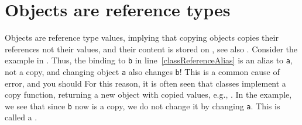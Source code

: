 \begin{comment}
Combinations of non-static member definitions are shown in \Cref{classMemberDefinition}.
%
\fsCode{classMemberDefinition}{classMemberDefinition}{A large variation of class member definitions. This program intentionally does not compile, but demonstrates variation that will, and problematic lines are indicated by the in-code comments.}{}
%
The \lstinline{val}-keyword in this context has not been discussed previously.\jon{maybe mention ``Explicit Field'', \url{https://docs.microsoft.com/en-us/dotnet/fsharp/language-reference/members/explicit-fields-the-val-keyword}.} \lstinline{staticMemberV} and \lstinline{staticMemberValV} have the same interface. The \lstinline{[<DefaultValue>] val mutable valMutableV : int} has not been discussed and is discouraged, but gives a mutable property that is initialized to the type's default value, e.g., \lstinline{Unchecked.defaultof<int>} in this case. \idx{\lstinline{[<DefaultValue>]}} is called an \idx{attribute}, but will not be discussed further.\jon{Should attributes be included \url{https://docs.microsoft.com/en-us/dotnet/fsharp/language-reference/attributes}?} Defining mutable properties is illegal, but allowed using explicit get and set functions. The definitions for \lstinline{valMutableV}, \lstinline{memberValGetSetV} and \lstinline{memberThisGetSetV} gives the same interface to a mutable variable, but with slight variation in how their initial value is set, and how get and set actions can be programmed. In general, \advice{minimize the use of constructions using the \keyword{val}-keyword in class definitions for brevity.}  All the above holds for static definitions except \lstinline{[<DefaultValue>] static val mutable staticValMutableV : int} is illegal.

\end{comment}
\section{Objects are reference types}
Objects are reference type values, implying that copying objects copies their references not their values, and their content is stored on , see also . Consider the example in .
%
%
Thus, the binding to \lstinline{b} in line~\ref{classReferenceAlias} is an alias to \lstinline{a}, not a copy, and changing object \lstinline{a} also changes \lstinline{b}! This is a common cause of error, and you should  For this reason, it is often seen that classes implement a copy function, returning a new object with copied values, e.g., .
%
%
In the example, we see that since \lstinline{b} now is a copy, we do not change it by changing \lstinline{a}. This is called a .

